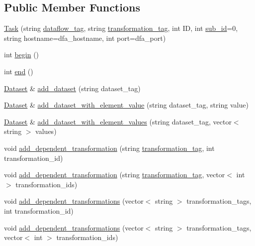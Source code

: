 \subsection*{Public Member Functions}
\begin{DoxyCompactItemize}
\item 
\hyperlink{classTask_a27670d3d842b1c4ab38d2eacd5f5a920}{Task} (string \hyperlink{classTask_a7a3b3f194a78e928cd9a88420676cfa2}{dataflow\+\_\+tag}, string \hyperlink{classTask_a013314768d0b474bcc567f1cb98a1c01}{transformation\+\_\+tag}, int ID, int \hyperlink{classTask_aa5e5de369b641d4a6d66bd468d47b28b}{sub\+\_\+id}=0, string hostname=dfa\+\_\+hostname, int port=dfa\+\_\+port)
\item 
int \hyperlink{classTask_a8cb9bc9ccfc534b6cdd42edf15bad98e}{begin} ()
\item 
int \hyperlink{classTask_ad6acbe7ba8643e046513bf8d66e5f578}{end} ()
\item 
\hyperlink{classDataset}{Dataset} \& \hyperlink{classTask_a618a7fb22a6e06cf918def06da96f777}{add\+\_\+dataset} (string dataset\+\_\+tag)
\item 
\hyperlink{classDataset}{Dataset} \& \hyperlink{classTask_a052ec7c44c26ed666d327eb1b34451d8}{add\+\_\+dataset\+\_\+with\+\_\+element\+\_\+value} (string dataset\+\_\+tag, string value)
\item 
\hyperlink{classDataset}{Dataset} \& \hyperlink{classTask_ad0eeaa007ee192d7866a101c93730ab7}{add\+\_\+dataset\+\_\+with\+\_\+element\+\_\+values} (string dataset\+\_\+tag, vector$<$ string $>$ values)
\item 
void \hyperlink{classTask_a5171db4ee3e3065b21fd8085debc5e7e}{add\+\_\+dependent\+\_\+transformation} (string \hyperlink{classTask_a013314768d0b474bcc567f1cb98a1c01}{transformation\+\_\+tag}, int transformation\+\_\+id)
\item 
void \hyperlink{classTask_a839d94a0d3191d6f6ca7caf4a92c140b}{add\+\_\+dependent\+\_\+transformation} (string \hyperlink{classTask_a013314768d0b474bcc567f1cb98a1c01}{transformation\+\_\+tag}, vector$<$ int $>$ transformation\+\_\+ids)
\item 
void \hyperlink{classTask_a2307623af7ceb989b236a2c5dd0f715c}{add\+\_\+dependent\+\_\+transformations} (vector$<$ string $>$ transformation\+\_\+tags, int transformation\+\_\+id)
\item 
void \hyperlink{classTask_a381ed34fcd5d4e429fde0bb56ae5553a}{add\+\_\+dependent\+\_\+transformations} (vector$<$ string $>$ transformation\+\_\+tags, vector$<$ int $>$ transformation\+\_\+ids)
\item 

\end{DoxyCompactItemize}

